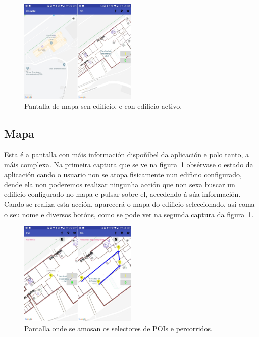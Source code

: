 \begin{figure}[h]
	\begin{center}
		\includegraphics[width=0.5\textwidth]{figures/android/mapaEdificio}
		\caption{Pantalla de mapa sen edificio, e con edificio activo.}
		\label{fig:mapaEdificio}
	\end{center}
\end{figure}


\subsection{Mapa}
Esta é a pantalla con máis información dispoñíbel da aplicación e polo tanto, a máis complexa. Na primeira captura que se ve na figura~\ref{fig:mapaEdificio} obsérvase o estado da aplicación cando o usuario non se atopa fisicamente nun edificio configurado, dende ela non poderemos realizar ningunha acción que non sexa buscar un edificio configurado no mapa e pulsar sobre el, accedendo á súa información. Cando se realiza esta acción, aparecerá o mapa do edificio seleccionado, así coma o seu nome e diversos botóns, como se pode ver na segunda captura da figura~\ref{fig:mapaEdificio}.

\begin{figure}[h]
	\begin{center}
		\includegraphics[width=0.5\textwidth]{figures/android/mapaSelector}
		\caption{Pantalla onde se amosan os selectores de POIs e percorridos.}
		\label{fig:mapaSelector}
	\end{center}
\end{figure}

